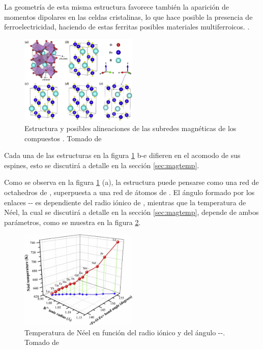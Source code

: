 \documentclass[../main.tex]{subfiles}
\begin{document}
La geometría de esta misma estructura favorece también la aparición de momentos dipolares en las celdas cristalinas, lo que hace posible la presencia de ferroelectricidad, haciendo de estas ferritas posibles materiales multiferroicos. \cite{Sharma2024}.
\begin{figure}[H]
    \centering
    \includegraphics[width=0.5\textwidth]{fig/estructura.jpg}
    \caption{Estructura y posibles alineaciones de las subredes magnéticas de los compuestos . Tomado de \cite{Wang2019}}
    \label{fig:estructuras}
\end{figure}
Cada una de las estructuras en la figura \ref{fig:estructuras} b-e difieren en el acomodo de sus espines, esto se discutirá a detalle en la sección \ref{sec:magtemp}.


Como se observa en la figura \ref{fig:estructuras} (a), la estructura puede pensarse como una red de octahedros de , superpuesta a una red de átomos de . El ángulo formado por los enlaces -- es dependiente del radio iónico de , mientras que la temperatura de Néel, la cual se discutirá a detalle en la sección \ref{sec:magtemp}, depende de ambos parámetros, como se muestra en la figura \ref{fig:neelradio}.

\begin{figure}[H]
    \centering
    \includegraphics[width=0.5\textwidth]{fig/neelradio.jpg}
    \caption{Temperatura de Néel en función del radio iónico y del ángulo --. Tomado de \cite{Wang2019}}
    \label{fig:neelradio}
\end{figure}
\end{document}
